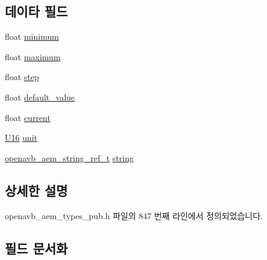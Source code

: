 \subsection*{데이타 필드}
\begin{DoxyCompactItemize}
\item 
float \hyperlink{structopenavb__aem__control__value__format__control__linear__float__t_a1fac701369b1197497f7c698ad74386d}{minimum}
\item 
float \hyperlink{structopenavb__aem__control__value__format__control__linear__float__t_a466d4dab1bd38a43438c2e5e6ad5534e}{maximum}
\item 
float \hyperlink{structopenavb__aem__control__value__format__control__linear__float__t_a863c86bdfd96bf9c461846689c2614aa}{step}
\item 
float \hyperlink{structopenavb__aem__control__value__format__control__linear__float__t_ab3be3ad77ec8f6689d9d54346fcae3f1}{default\+\_\+value}
\item 
float \hyperlink{structopenavb__aem__control__value__format__control__linear__float__t_af9653d31acfffa5a40aa709b2065e00b}{current}
\item 
\hyperlink{openavb__types__base__pub_8h_a0a0a322d5fa4a546d293a77ba8b4a71f}{U16} \hyperlink{structopenavb__aem__control__value__format__control__linear__float__t_a0b3ff376c10369016824076deacc055e}{unit}
\item 
\hyperlink{structopenavb__aem__string__ref__t}{openavb\+\_\+aem\+\_\+string\+\_\+ref\+\_\+t} \hyperlink{structopenavb__aem__control__value__format__control__linear__float__t_a1f81001cefa769cb3651172fd5ab0748}{string}
\end{DoxyCompactItemize}


\subsection{상세한 설명}


openavb\+\_\+aem\+\_\+types\+\_\+pub.\+h 파일의 847 번째 라인에서 정의되었습니다.



\subsection{필드 문서화}
